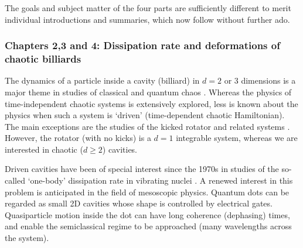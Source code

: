 The goals and subject matter of the four parts are sufficiently different
to merit individual introductions and summaries, which now follow without
further ado.



\subsubsection{Chapters 2,3 and 4: Dissipation rate and
deformations of chaotic billiards}


The dynamics of a particle inside a cavity
(billiard) in $d=2$ or 3 dimensions 
is a major theme in studies of classical and quantum chaos
\cite{ottbook,hellerleshouches,berryleshouches}.
Whereas the physics of time-independent chaotic systems 
is extensively explored, less is known 
about the physics when such a system is `driven' (time-dependent
chaotic Hamiltonian).
The main exceptions are the studies of 
the kicked rotator and related systems \cite{qkr}. 
However, the rotator (with no kicks) 
is a $d=1$ integrable system, whereas we 
are interested in chaotic ($d\ge2$) cavities.


Driven cavities have been of special interest since the 1970s in
studies of the so-called `one-body' dissipation rate in vibrating nuclei 
\cite{wall,koonincl,kooninqm,jarz92,jarz93}.
A renewed interest in this problem is anticipated
in the field of mesoscopic physics. Quantum dots \cite{been,dittrich}
can be regarded as small 2D cavities whose shape 
is controlled by electrical gates. Quasiparticle motion inside the dot
can have long coherence (dephasing) times,
and enable the semiclassical regime to be approached (many wavelengths
across the system).


